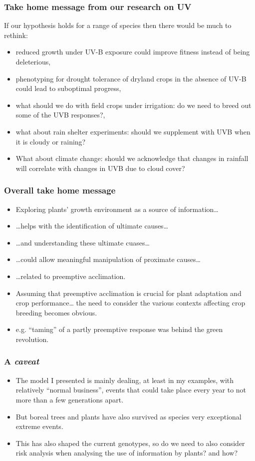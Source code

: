 \documentclass[10pt]{beamer}\usepackage[]{graphicx}\usepackage[]{xcolor}
\begin{document}
\begin{frame}
  \frametitle{Take home message from our research on UV}
  If our hypothesis holds for a range of species then there would be much to rethink:
  \begin{itemize}
    \item reduced growth under UV-B exposure could improve fitness instead of being deleterious,
    \item phenotyping for drought tolerance of dryland crops in the absence of UV-B could lead to suboptimal progress,
    \item what should we do with field crops under irrigation: do we need to breed out some of the UVB responses?,
    \item what about rain shelter experiments: should we supplement with UVB when it is cloudy or raining?
    \item What about climate change: should we acknowledge that changes in rainfall will correlate with changes in UVB due to cloud cover?
  \end{itemize}
\end{frame}

\begin{frame}
  \frametitle{Overall take home message}
  \begin{itemize}
    \item Exploring plants' growth environment as a source of information\ldots
    \item \ldots helps with the identification of ultimate causes\ldots
    \item \ldots and understanding these ultimate cuases\ldots
    \item \ldots could allow meaningful manipulation of proximate causes\ldots
    \item \ldots related to preemptive acclimation.
    \item Assuming that preemptive acclimation is crucial for plant adaptation and crop performance\ldots
    the need to consider the various contexts affecting crop breeding becomes obvious.
    \item e.g. ``taming'' of a partly preemptive response was behind the green revolution.
  \end{itemize}
\end{frame}

\begin{frame}
  \frametitle{A \emph{caveat}}
  \begin{itemize}
    \item The model I presented is mainly dealing, at least in my examples, with relatively ``normal business'', events that could take place every year to not more than a few generations apart.
    \item But boreal trees and plants have also survived as species very exceptional extreme events.
    \item This has also shaped the current genotypes, so do we need to also consider risk analysis when analysing the use of information by plants? and how?
  \end{itemize}
\end{frame}
\end{document}
